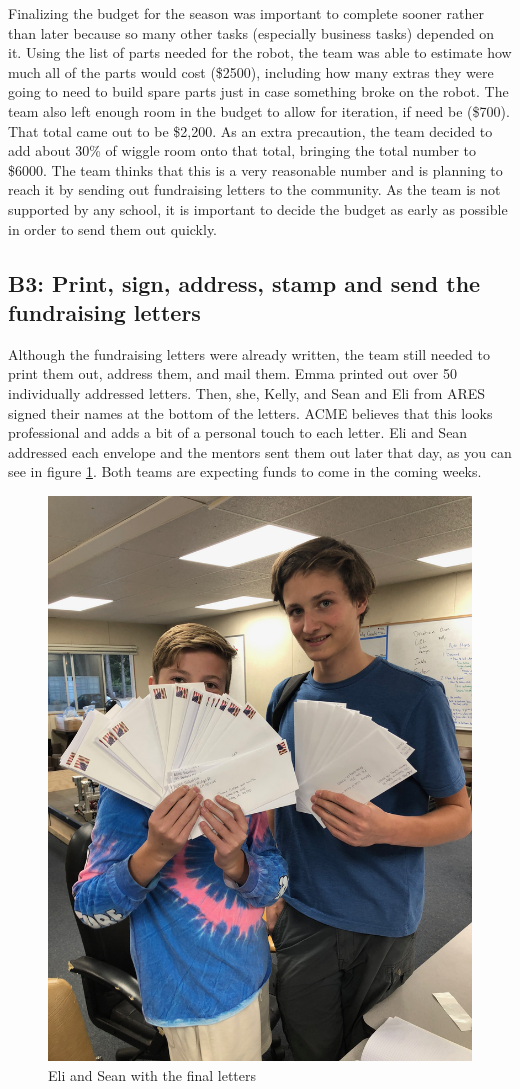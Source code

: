 \documentclass{article}
\begin{document}
Finalizing the budget for the season was important to complete sooner rather than later because so many other tasks (especially business tasks) depended on it. Using the list of parts needed for the robot, the team was able to estimate how much all of the parts would cost (\$2500), including how many extras they were going to need to build spare parts just in case something broke on the robot. The team also left enough room in the budget to allow for iteration, if need be (\$700). That total came out to be \$2,200. As an extra precaution, the team decided to add about 30\% of wiggle room onto that total, bringing the total number to \$6000. The team thinks that this is a very reasonable number and is planning to reach it by sending out fundraising letters to the community. As the team is not supported by any school, it is important to decide the budget as early as possible in order to send them out quickly.

\subsection{B3: Print, sign, address, stamp and send the fundraising letters}

Although the fundraising letters were already written, the team still needed to print them out, address them, and mail them. Emma printed out over 50 individually addressed letters. Then, she, Kelly, and Sean and Eli from ARES signed their names at the bottom of the letters. ACME believes that this looks professional and adds a bit of a personal touch to each letter.  Eli and Sean addressed each envelope and the mentors sent them out later that day, as you can see in figure \ref{fig:Letters}. Both teams are expecting funds to come in the coming weeks. 

\begin{figure}
    \centering
    \includegraphics[width=.6 \textwidth]{07_10-15/images/letters.jpg}
    \caption{Eli and Sean with the final letters}
    \label{fig:Letters}
\end{figure}
\end{document}
